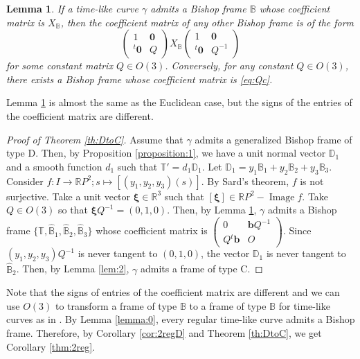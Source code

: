 \documentclass[a4paper]{amsart}
\newtheorem{lemma}[theorem]{Lemma}
\theoremstyle{definition}
\theoremstyle{remark}
\newcommand{\BB}{\mathbb{B}}
\newcommand{\DD}{\mathbb{D}}
\newcommand{\RR}{\mathbb{R}}
\newcommand{\TT}{\mathbb{T}}
\renewcommand{\o}{\bm{0}}
\numberwithin{equation}{section}
\begin{document}
\begin{lemma}\label{lem:Bishop}
If a time-like curve $\gamma$ admits a Bishop frame $\BB$ whose coefficient matrix is $X_{\BB}$, then the coefficient matrix of any other Bishop frame is of the form 
\begin{equation}\label{eq:Qc}
\begin{pmatrix}1 & \o \\ {}^{t}\o & Q\end{pmatrix}
X_{\BB}\begin{pmatrix}1 & \o \\ {}^{t}\o & Q^{-1} \end{pmatrix}
\end{equation}
for some constant matrix $Q \in O(3)$. Conversely, for any constant $Q \in O(3)$, there exists a Bishop frame whose coefficient matrix is \eqref{eq:Qc}.
\end{lemma}
Lemma \ref{lem:Bishop} is almost the same as the Euclidean case, but the signs of the entries of the coefficient matrix are different.
\begin{proof}[Proof of Theorem \ref{th:DtoC}]
Assume that $\gamma$ admits a generalized Bishop frame of type D. Then, by Proposition \ref{proposition:1}, we have a unit normal vector $\DD_1$ and a smooth function $d_1$ such that $\TT'=d_1\DD_1$.  
Let $\DD_1 = y_1\BB_1 + y_2\BB_2 +y_3\BB_3$.
Consider $f : I \to \RR P^{2} ; s \mapsto [(y_1,y_2,y_3)(s)]$. By Sard's theorem, $f$ is not surjective. Take a unit vector $\bm{\xi} \in \RR^3$ such that $[\bm{\xi}] \in \RR P^{2} - \operatorname{Image} f$. Take $Q \in O(3)$ so that $\bm{\xi} Q^{-1} = (0,1,0)$. Then, by Lemma \ref{lem:Bishop}, $\gamma$ admits a Bishop frame $\{\TT, \hat{\BB}_1, \hat{\BB}_2, \hat{\BB}_3\}$ whose coefficient matrix is $\begin{pmatrix} 0 & {\bm b}Q^{-1}  \\ Q{}^{t}{\bm b} & O \end{pmatrix}$. Since $(y_1,y_2,y_3)Q^{-1}$ is never tangent to $(0,1,0)$, the vector $\DD_1$ is never tangent to $\hat{\BB}_2$. Then, by Lemma \ref{lem:2}, $\gamma$ admits a frame of type C.
\end{proof}
Note that the signs of entries of the coefficient matrix are different and we can use $O(3)$ to transform a frame of type $\BB$ to a frame of type $\BB$ for time-like curves as in \cite{NN}.
By Lemma \ref{lemma:0}, every regular time-like curve admits a Bishop frame. Therefore, by Corollary \ref{cor:2regD} and Theorem \ref{th:DtoC}, we get Corollary \ref{thm:2reg}.
\end{document}
